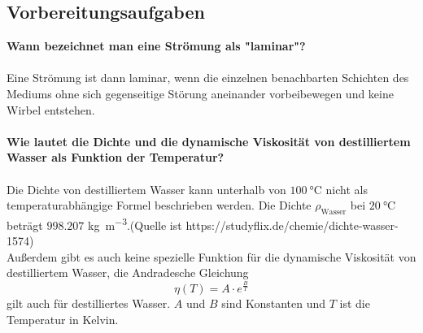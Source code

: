         \subsection{Vorbereitungsaufgaben}
            \label{sec:Vorbereitungsaufgaben}
            \textbf{Wann bezeichnet man eine Strömung als "laminar"?}\\
            \\
            Eine Strömung ist dann laminar, wenn die einzelnen benachbarten Schichten 
            des Mediums ohne sich gegenseitige Störung aneinander vorbeibewegen und 
            keine Wirbel entstehen. \\ 
            \\
            \textbf{Wie lautet die Dichte und die dynamische Viskosität von 
            destilliertem Wasser als Funktion der Temperatur?}\\
            \\
            Die Dichte von destilliertem Wasser kann unterhalb von  
            $\SI{100}{\celsius}$ nicht als temperaturabhängige Formel 
            beschrieben werden.
            Die Dichte $\rho_{\text{Wasser}}$ bei $\SI{20}{\celsius}$ beträgt $998.207$ 
            \unit[per-mode=fraction]{\kilo\gram\per\meter\tothe{3}}.(Quelle ist https://studyflix.de/chemie/dichte-wasser-1574)\\
            Außerdem gibt es auch keine spezielle Funktion für die dynamische
            Viskosität von destilliertem Wasser, die Andradesche Gleichung 
            \begin{equation}
            \eta (T) = A \cdot e^{\frac{B}{T}}
            \label{eqn:AndradescheGleichung}
            \end{equation} 
            gilt auch für destilliertes Wasser. $A$ und $B$ sind Konstanten und $T$ ist die Temperatur in Kelvin. 
